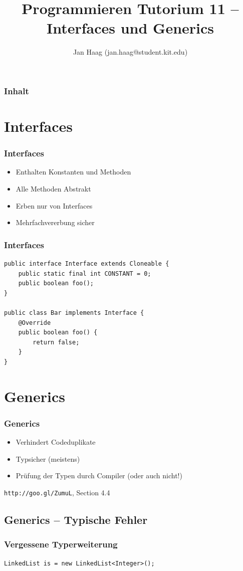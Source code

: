 \documentclass{beamer}
\author{Jan Haag (jan.haag@student.kit.edu)}
\title{Programmieren Tutorium 11 -- Interfaces und Generics}
\institute{Institut f\"{u}r Zeritfizierbare und Vertrauensw\"{u}rdige Informatiksysteme (ZVI)}
\begin{document}
\begin{frame}
\maketitle
\end{frame}

\begin{frame}
\frametitle{Inhalt}
\tableofcontents
\end{frame}

\section{Interfaces}
\begin{frame}[fragile]
\frametitle{Interfaces}
\begin{itemize}
\item Enthalten Konstanten und Methoden
\item Alle Methoden Abstrakt
\item Erben nur von Interfaces
\pause
\item Mehrfachvererbung sicher
\end{itemize}
\end{frame}

\begin{frame}[fragile]
\frametitle{Interfaces}
\begin{verbatim}
public interface Interface extends Cloneable {
    public static final int CONSTANT = 0;
    public boolean foo();
}

public class Bar implements Interface {
    @Override
    public boolean foo() {
        return false;
    }
}
\end{verbatim}
\end{frame}

\section{Generics}
\begin{frame}[fragile]
\frametitle{Generics}
\begin{itemize}
\item Verhindert Codeduplikate
\item Typsicher (meistens)
\item Pr\"{u}fung der Typen durch Compiler (oder auch nicht!)
\end{itemize}
\pause
\verb|http://goo.gl/ZumuL|, Section 4.4
\end{frame}

\subsection{Generics -- Typische Fehler}
\begin{frame}[fragile]
\frametitle{Vergessene Typerweiterung}
\begin{verbatim}
LinkedList is = new LinkedList<Integer>();
\end{verbatim}
\end{frame}
\end{document}
